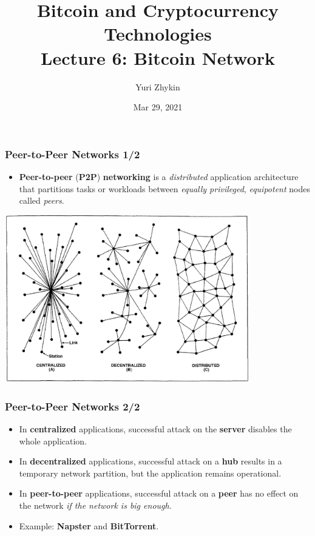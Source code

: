 \documentclass{beamer}
\title{
  Bitcoin and Cryptocurrency Technologies \\
  Lecture 6: Bitcoin Network
}
\author{Yuri Zhykin}
\date{Mar 29, 2021}
\begin{document}
\frame{\titlepage}

\begin{frame}
  \frametitle{Peer-to-Peer Networks 1/2}
  \begin{itemize}
  \item \textbf{Peer-to-peer} (\textbf{P2P}) \textbf{networking} is a
    \textit{distributed} application architecture that partitions tasks or
    workloads between \textit{equally privileged}, \textit{equipotent} nodes
    called \textit{peers}.
  \end{itemize}
  \begin{center}
    \includegraphics[width=0.8\textwidth]{networks}
  \end{center}
\end{frame}

\begin{frame}
  \frametitle{Peer-to-Peer Networks 2/2}
  \begin{itemize}
  \item In \textbf{centralized} applications, successful attack on the
    \textbf{server} disables the whole application.
  \item In \textbf{decentralized} applications, successful attack on a
    \textbf{hub} results in a temporary network partition, but the application
    remains operational.
  \item In \textbf{peer-to-peer} applications, successful attack on a
    \textbf{peer} has no effect on the network \textit{if the network is big
      enough}.
  \item Example: \textbf{Napster} and \textbf{BitTorrent}.
  \end{itemize}
\end{frame}
\end{document}
